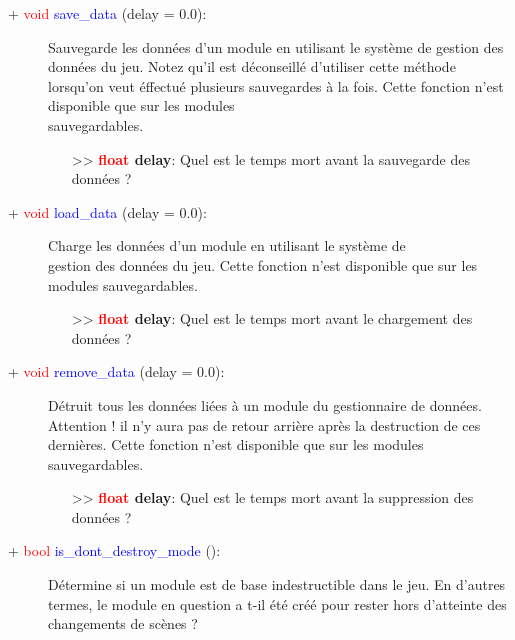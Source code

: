 \documentclass[a4paper, 11pt]{article}
\begin{document}
	\begin{description}
		\item [+ \textcolor{red}{void} \textcolor{blue}{save\_data} (delay = 0.0):] Sauvegarde les données 
		d'un module en utilisant le système de gestion des données du jeu. Notez qu'il est déconseillé 
		d'utiliser cette méthode lorsqu'on veut éffectué plusieurs sauvegardes à la fois. Cette fonction 
		n'est disponible que sur les modules \\sauvegardables.
		\begin{itemize}
			\item [>> \textbf{\textcolor{red}{float} delay}:] Quel est le temps mort avant la sauvegarde des 
			données ?\\
		\end{itemize}
	\end{description}
	\begin{description}
		\item [+ \textcolor{red}{void} \textcolor{blue}{load\_data} (delay = 0.0):] Charge les données d'un 
		module en utilisant le système de \\gestion des données du jeu. Cette fonction n'est disponible que 
		sur les modules sauvegardables.
		\begin{itemize}
			\item [>> \textbf{\textcolor{red}{float} delay}:] Quel est le temps mort avant le chargement des 
			données ?\\
		\end{itemize}
	\end{description}
	\begin{description}
		\item [+ \textcolor{red}{void} \textcolor{blue}{remove\_data} (delay = 0.0):] Détruit tous les 
		données liées à un module du gestionnaire de données. Attention ! il n'y aura pas de retour arrière 
		après la destruction de ces dernières. Cette fonction n'est disponible que sur les modules 
		sauvegardables.
		\begin{itemize}
			\item [>> \textbf{\textcolor{red}{float} delay}:] Quel est le temps mort avant la suppression 
			des données ?\\
		\end{itemize}
	\end{description}
	\begin{description}
		\item [+ \textcolor{red}{bool} \textcolor{blue}{is\_dont\_destroy\_mode} ():] Détermine si un 			
		module est de base indestructible dans le jeu. En d'autres termes, le module en question a t-il été 
		créé pour rester hors d'atteinte des \\changements de scènes ?\\
	\end{description}
\end{document}
